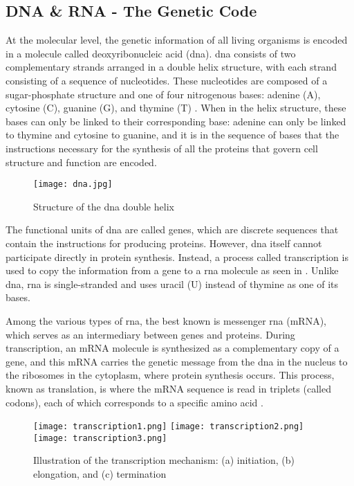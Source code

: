 \subsection{DNA \& RNA - The Genetic Code}

At the molecular level, the genetic information of all living organisms is
encoded in a molecule called deoxyribonucleic acid (\gls{dna}). \gls{dna}
consists of two complementary strands arranged in a double helix structure,
with each strand consisting of a sequence of nucleotides. These nucleotides are
composed of a sugar-phosphate structure and one of four nitrogenous bases:
adenine (A), cytosine (C), guanine (G), and thymine (T)
\cite{ConceptsBiology_DNA}. When in the helix structure, these bases can only
be linked to their corresponding base: adenine can only be linked to thymine
and cytosine to guanine, and it is in the sequence of bases that the
instructions necessary for the synthesis of all the proteins that govern cell
structure and function are encoded.

\begin{figure}[h]
  \centering
  \texttt{[image: dna.jpg]}
  \caption{Structure of the \gls{dna} double helix}
  \label{fig:dna}
\end{figure}

The functional units of \gls{dna} are called genes, which are discrete
sequences that contain the instructions for producing proteins. However,
\gls{dna} itself cannot participate directly in protein synthesis. Instead, a
process called transcription is used to copy the information from a gene to a
\gls{rna} molecule as seen in \textcite{basic_biology_NCBI2002}. Unlike
\gls{dna}, \gls{rna} is single-stranded and uses uracil (U) instead of thymine
as one of its bases.

Among the various types of \gls{rna}, the best known is messenger \gls{rna}
(mRNA), which serves as an intermediary between genes and proteins. During
transcription, an mRNA molecule is synthesized as a complementary copy of a
gene, and this mRNA carries the genetic message from the \gls{dna} in the
nucleus to the ribosomes in the cytoplasm, where protein synthesis occurs. This
process, known as translation, is where the mRNA sequence is read in triplets
(called codons), each of which corresponds to a specific amino acid
\cite{central_dogma_molecular}.

\begin{figure}[h]
  \centering
  \texttt{[image: transcription1.png]}
  \texttt{[image: transcription2.png]}
  \texttt{[image: transcription3.png]}
  \caption{Illustration of the transcription mechanism: (a) initiation, (b) elongation, and (c) termination}
  \label{fig:transcription}
\end{figure}

